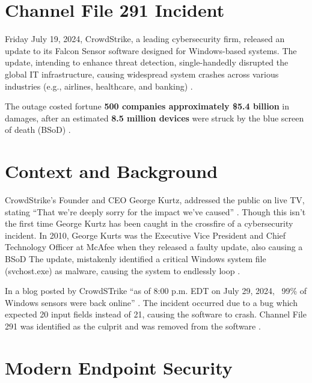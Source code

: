 

\section{Channel File 291 Incident}
\label{sec:crowd}

Friday July 19, 2024, CrowdStrike, a leading cybersecurity firm, released an update to its Falcon Sensor
software designed for Windows-based systems. The update, intending to enhance threat detection, single-handedly
disrupted the global IT infrastructure, causing widespread system crashes across various industries
(e.g., airlines, healthcare, and banking) \cite{crowdstrike2024falcon}.

The outage costed fortune \textbf{500 companies approximately \$5.4 billion} in damages, after an
estimated \textbf{8.5 million devices} were struck by the blue screen of death (BSoD) \cite{tidy_crowdstrike_outage_2024}\cite{kerner_crowdstrike_outage_2024}.

\section{Context and Background}
\label{sec:context}

CrowdStrike's Founder and CEO George Kurtz, addressed the public on live TV, stating ``That we're deeply sorry for the impact we've caused'' \cite{sato_crowdstrike_ceo_2024}.
Though this isn't the first time George Kurtz has been caught in the crossfire of a cybersecurity incident.
In 2010, George Kurts was the Executive Vice President and Chief Technology Officer at McAfee when they released a faulty update, also causing a BSoD
The update, mistakenly identified a critical Windows system file (svchost.exe) as malware, causing the system to endlessly loop \cite{volenik_crowdstrike_ceo_2024}.

In a blog posted by CrowdSTrike ``as of 8:00 p.m. EDT on July 29, 2024, ~99\% of Windows sensors were back online'' \cite{crowdstrike_channel_file_291_2024}.
The incident occurred due to a bug which expected 20 input fields instead of 21, causing the software to crash. Channel File 291 was identified as the
culprit and was removed from the software \cite{crowdstrike_channel_file_291_2024}.

\section{Modern Endpoint Security}
\label{sec:falcon}

